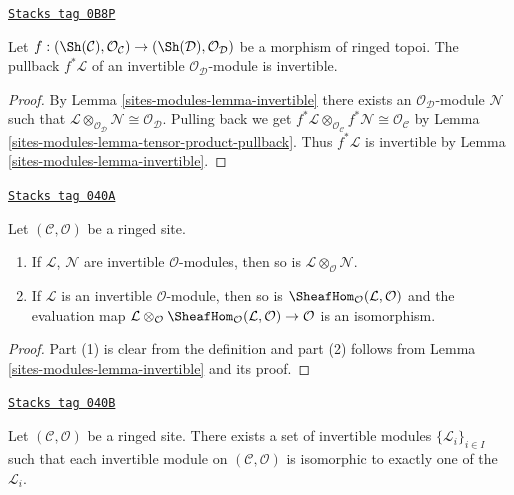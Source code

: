 \begin{lemma}
\label{sites-modules-lemma-pullback-invertible}
\href{https://stacks.math.columbia.edu/tag/0B8P}{\texttt{Stacks tag 0B8P}}

Let $f : (\Sh(\mathcal{C}), \mathcal{O}_\mathcal{C}) \to
(\Sh(\mathcal{D}), \mathcal{O}_\mathcal{D})$ be a
morphism of ringed topoi. The pullback $f^*\mathcal{L}$ of an
invertible $\mathcal{O}_\mathcal{D}$-module is invertible.
\end{lemma}

\begin{proof}
By Lemma \ref{sites-modules-lemma-invertible}
there exists an $\mathcal{O}_\mathcal{D}$-module $\mathcal{N}$ such that
$\mathcal{L} \otimes_{\mathcal{O}_\mathcal{D}} \mathcal{N} \cong
\mathcal{O}_\mathcal{D}$. Pulling back we get
$f^*\mathcal{L} \otimes_{\mathcal{O}_\mathcal{C}} f^*\mathcal{N} \cong
\mathcal{O}_\mathcal{C}$
by Lemma \ref{sites-modules-lemma-tensor-product-pullback}.
Thus $f^*\mathcal{L}$ is invertible by Lemma \ref{sites-modules-lemma-invertible}.
\end{proof}

\begin{lemma}
\label{sites-modules-lemma-constructions-invertible}
\href{https://stacks.math.columbia.edu/tag/040A}{\texttt{Stacks tag 040A}}

Let $(\mathcal{C}, \mathcal{O})$ be a ringed site.
\begin{enumerate}
\item If $\mathcal{L}$, $\mathcal{N}$ are invertible
$\mathcal{O}$-modules, then so is
$\mathcal{L} \otimes_\mathcal{O} \mathcal{N}$.
\item If $\mathcal{L}$ is an invertible
$\mathcal{O}$-module, then so is
$\SheafHom_\mathcal{O}(\mathcal{L}, \mathcal{O})$ and the evaluation map
$\mathcal{L} \otimes_\mathcal{O}
\SheafHom_\mathcal{O}(\mathcal{L}, \mathcal{O}) \to \mathcal{O}$
is an isomorphism.
\end{enumerate}
\end{lemma}

\begin{proof}
Part (1) is clear from the definition and part (2) follows from
Lemma \ref{sites-modules-lemma-invertible} and its proof.
\end{proof}

\begin{lemma}
\label{sites-modules-lemma-pic-set}
\href{https://stacks.math.columbia.edu/tag/040B}{\texttt{Stacks tag 040B}}

Let $(\mathcal{C}, \mathcal{O})$ be a ringed site.
There exists a set of invertible modules $\{\mathcal{L}_i\}_{i \in I}$
such that each invertible module on $(\mathcal{C}, \mathcal{O})$
is isomorphic to exactly one of the $\mathcal{L}_i$.
\end{lemma}

